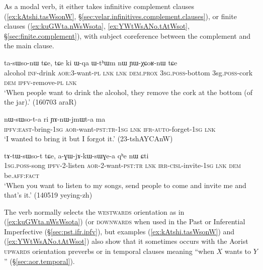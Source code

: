 As a modal verb, it either takes infinitive complement clauses (\ref{ex:kAtshi.tasWsonW}, §\ref{sec:velar.infinitives.complement.clauses}), or finite clauses (\ref{ex:kuGWta.nWsWsota}, \ref{ex:YWtWsANo.tAtWsot}, §\ref{sec:finite.complement}), with subject coreference between the complement and the main clause.  
 
\begin{exe}
\ex \label{ex:kAtshi.tasWsonW}
 ta-sɯso-nɯ tɕe, tɕe ki ɯ-qa ɯ-tʰɯm nɯ ɲɯ-χɕoʁ-nɯ tɕe \\
alcohol \textsc{inf}-drink \textsc{aor}:3\flobv{}-want-\textsc{pl} \textsc{lnk} \textsc{lnk} \textsc{dem}.\textsc{prox} \textsc{3sg}.\textsc{poss}-bottom {3sg}.\textsc{poss}-cork \textsc{dem} \textsc{ipfv}-remove-\textsc{pl} \textsc{lnk} \\
\glt `When people want to drink the alcohol, they remove the cork at the bottom (of the jar).' (160703 araR)
\end{exe}

\begin{exe}
\ex \label{ex:kuGWta.nWsWsota}
\gll [ku-ɣɯt-a] nɯ-sɯso-t-a ri ɲɤ-nɯ-jmɯt-a ma\\
\textsc{ipfv}:\textsc{east}-bring-\textsc{1sg} \textsc{aor}-want-\textsc{pst}:\textsc{tr}-\textsc{1sg} \textsc{lnk} \textsc{ifr}-\textsc{auto}-forget-\textsc{1sg} \textsc{lnk}\\
\glt `I wanted to bring it but I forgot it.' (23-tshAYCAnW)
\end{exe}
 
\begin{exe}
\ex \label{ex:YWtWsANo.tAtWsot}
 tɤ-tɯ-sɯso-t tɕe, a-ɣɯ-jɤ-kɯ-sɯɣe-a qʰe nɯ ɕti \\
\textsc{1sg}.\textsc{poss}-song \textsc{ipfv}-2-listen \textsc{aor}-2-want-\textsc{pst}:\textsc{tr} \textsc{lnk} \textsc{irr}-\textsc{cisl}-invite-\textsc{1sg} \textsc{lnk} \textsc{dem} be.\textsc{aff}:\textsc{fact} \\
\glt   `When you want to listen to my songs, send people to come and invite me and that's it.' (140519 yeying-zh)
\end{exe}

The verb  normally selects the \textsc{westwards} orientation as in (\ref{ex:kuGWta.nWsWsota}) (or \textsc{downwards} when used in the Past or Inferential Imperfective (§\ref{sec:pst.ifr.ipfv}), but examples (\ref{ex:kAtshi.tasWsonW}) and (\ref{ex:YWtWsANo.tAtWsot}) also show that it sometimes occurs with the Aorist \textsc{upwards} orientation preverbs  or  in temporal clauses meaning ``when $X$ wants to $Y$'' (§\ref{sec:aor.temporal}).
  
